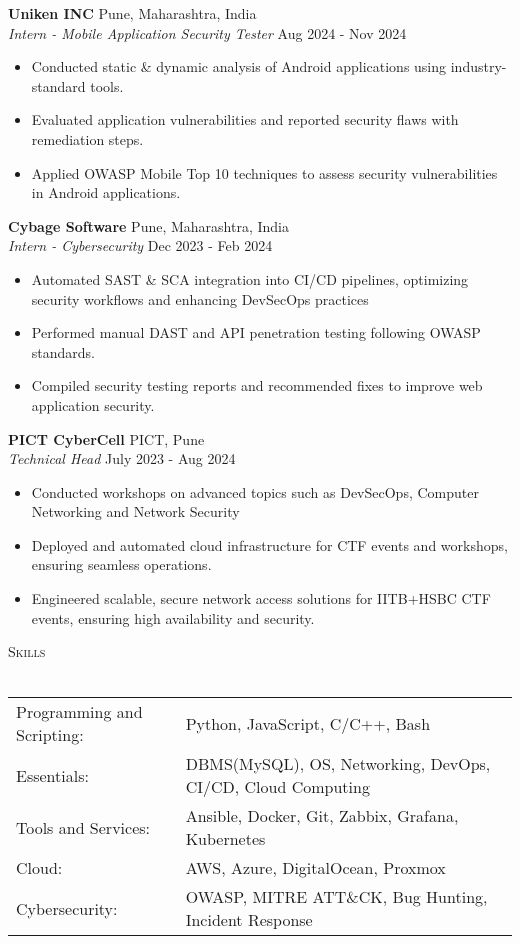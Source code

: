 \documentclass[a4paper]{article}
\newcommand{\lineunder} {
    \vspace*{-8pt} \\
    \hspace*{-18pt} \hrulefill \\
}
\newcommand{\header} [1] {
    {\hspace*{-18pt}\vspace*{6pt} \textsc{#1}}
    \vspace*{-6pt} \lineunder
}
\begin{document}
\textbf{Uniken INC} \hfill Pune, Maharashtra, India\\
\textit{Intern - Mobile Application Security Tester} \hfill Aug 2024 - Nov 2024\\
\vspace{-1mm}
\begin{itemize} \itemsep 1pt
	\item Conducted static \& dynamic analysis of Android applications using industry-standard tools.
	\item Evaluated application vulnerabilities and reported security flaws with remediation steps.
	\item Applied OWASP Mobile Top 10 techniques to assess security vulnerabilities in Android applications.
\end{itemize}
\textbf{Cybage Software} \hfill Pune, Maharashtra, India\\
\textit{Intern - Cybersecurity} \hfill Dec 2023 - Feb 2024\\
\vspace{-1mm}
\begin{itemize} \itemsep 1pt
	\item Automated SAST \& SCA integration into CI/CD pipelines, optimizing security workflows and enhancing DevSecOps practices
	\item Performed manual DAST and API penetration testing following OWASP standards.
	\item Compiled security testing reports and recommended fixes to improve web application security.
\end{itemize}
\textbf{PICT CyberCell} \hfill PICT, Pune\\
\textit{Technical Head} \hfill July 2023 - Aug 2024\\
\vspace{-1mm}
\begin{itemize} \itemsep 1pt
	\item Conducted workshops on advanced topics such as DevSecOps, Computer Networking and Network Security
	\item Deployed and automated cloud infrastructure for CTF events and workshops, ensuring seamless operations.
	\item Engineered scalable, secure network access solutions for IITB+HSBC CTF events, ensuring high availability and security.
\end{itemize}

\header{Skills}
\begin{tabular}{ l l }
	Programming and Scripting: & Python, JavaScript, C/C++, Bash                             \\
	Essentials:                & DBMS(MySQL), OS, Networking, DevOps, CI/CD, Cloud Computing \\
	Tools and Services:        & Ansible, Docker, Git, Zabbix, Grafana, Kubernetes           \\
	Cloud:                     & AWS, Azure, DigitalOcean, Proxmox                           \\
	Cybersecurity:             & OWASP, MITRE ATT\&CK, Bug Hunting, Incident Response        \\
\end{tabular}
\vspace{2mm}
\end{document}
